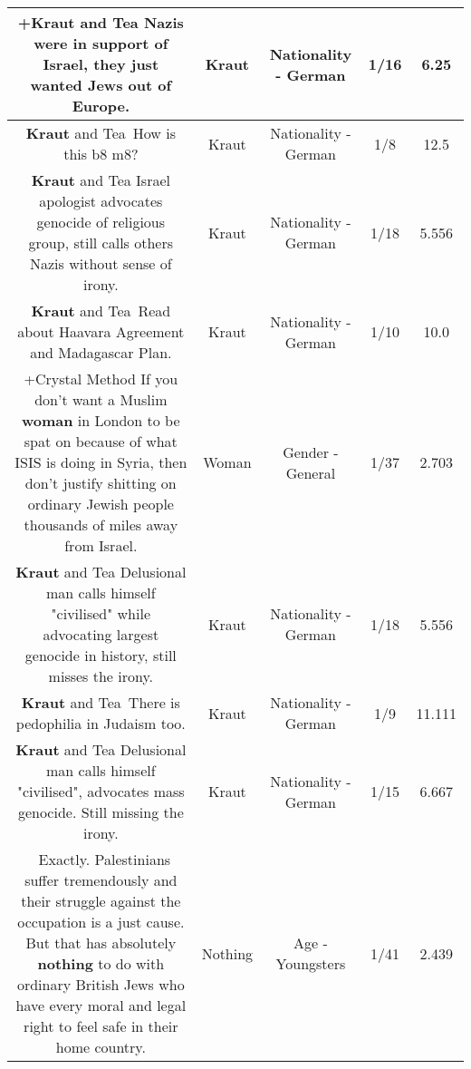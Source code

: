 \documentclass[11pt]{article}
\newlength\mylength
\begin{document}
\begin{center}
\begin{longtable}{|C{.65\mylength}|C{.30\mylength}|C{.12\mylength}|C{.12\mylength}|C{.12\mylength}|}
  \small +\textbf{Kraut} and Tea Nazis were in support of Israel, they just wanted Jews out of Europe.\normalsize   & Kraut & Nationality - German & 1/16 & 6.25 \\  \hline
  \small \@\textbf{Kraut} and Tea How is this b8 m8?\normalsize   & Kraut & Nationality - German & 1/8 & 12.5 \\  \hline
  \small \@\textbf{Kraut} and Tea Israel apologist advocates genocide of religious group, still calls others Nazis without sense of irony.\normalsize   & Kraut & Nationality - German & 1/18 & 5.556 \\  \hline
  \small \@\textbf{Kraut} and Tea Read about Haavara Agreement and Madagascar Plan.\normalsize   & Kraut & Nationality - German & 1/10 & 10.0 \\  \hline
  \small +Crystal Method If you don't want a Muslim \textbf{woman} in London to be spat on because of what ISIS is doing in Syria, then don't justify shitting on ordinary Jewish people thousands of miles away from Israel.\normalsize   & Woman & Gender - General & 1/37 & 2.703 \\  \hline
  \small \@\textbf{Kraut} and Tea Delusional man calls himself "civilised" while advocating largest genocide in history, still misses the irony.\normalsize   & Kraut & Nationality - German & 1/18 & 5.556 \\  \hline
  \small \@\textbf{Kraut} and Tea There is pedophilia in Judaism too.\normalsize   & Kraut & Nationality - German & 1/9 & 11.111 \\  \hline
  \small \@\textbf{Kraut} and Tea Delusional man calls himself "civilised", advocates mass genocide. Still missing the irony.\normalsize   & Kraut & Nationality - German & 1/15 & 6.667 \\  \hline
  \small {} Exactly. Palestinians suffer tremendously and their struggle against the occupation is a just cause. But that has absolutely \textbf{nothing} to do with ordinary British Jews who have every moral and legal right to feel safe in their home country.\normalsize   & Nothing & Age - Youngsters & 1/41 & 2.439 \\  \hline

\end{longtable}
\end{center}
\end{document}
